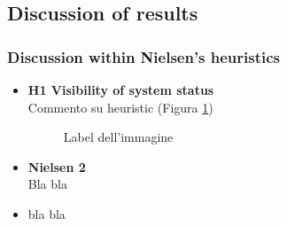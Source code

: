 \pagebreak

\subsection{Discussion of results}
\subsubsection{Discussion within Nielsen's heuristics}
\begin{itemize}
    \item \textbf{H1 Visibility of system status}\\
    Commento su heuristic (Figura \ref{fig:1-image-ref})
    \begin{figure}[!ht]
        \begin{minipage}{\linewidth}
            \centering
            \captionsetup{justification=centering}
            \caption{Label dell'immagine}
            \label{fig:1-image-ref}
        \end{minipage}
    \end{figure}
    \item \textbf{Nielsen 2}\\
    Bla bla
    \item bla bla
\end{itemize}
\pagebreak
